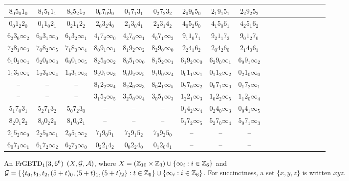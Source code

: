 \documentclass[draft, 11pt]{article}
\begin{document}
\begin{figure}[h!]
\renewcommand{\arraystretch}{1.2}
 \setlength\tabcolsep{1pt}
 \centering
 \small
\begin{tabular}{|c|c|c|c|c|c|c|c|c|c|c|c|c|c|c|c|c|c| }
\hline
$8_0 5_0 1_0$ & $8_1 5_1 1_1$ & $8_2 5_2 1_2$ & $0_0 7_0 3_0$ & $0_1 7_1 3_1$ & $0_2 7_2 3_2$ & $2_0 9_0 5_0$ & $2_1 9_1 5_1$ & $2_2 9_2 5_2$ \\\hline
$0_0 1_2 2_0$ & $0_1 1_0 2_1$ & $0_2 1_1 2_2$ & $2_0 3_2 4_0$ & $2_1 3_0 4_1$ & $2_2 3_1 4_2$ & $4_0 5_2 6_0$ & $4_1 5_0 6_1$ & $4_2 5_1 6_2$ \\\hline
$6_2 3_0 \infty_2$ & $6_0 3_1 \infty_0$ & $6_1 3_2 \infty_1$ & $4_1 7_2 \infty_0$ & $4_2 7_0 \infty_1$ & $4_0 7_1 \infty_2$ & $9_1 1_0 7_1$ & $9_2 1_1 7_2$ & $9_0 1_2 7_0$ \\\hline
$7_2 8_1 \infty_3$ & $7_0 8_2 \infty_5$ & $7_1 8_0 \infty_4$ & $8_0 9_1 \infty_1$ & $8_1 9_2 \infty_2$ & $8_2 9_0 \infty_0$ & $2_2 4_1 6_2$ & $2_0 4_2 6_0$ & $2_1 4_0 6_1$ \\\hline
$6_1 0_2 \infty_4$ & $6_2 0_0 \infty_3$ & $6_0 0_1 \infty_5$ & $8_2 5_0 \infty_2$ & $8_0 5_1 \infty_0$ & $8_1 5_2 \infty_1$ & $6_1 9_2 \infty_0$ & $6_2 9_0 \infty_1$ & $6_0 9_1 \infty_2$ \\\hline
$1_1 3_2 \infty_5$ & $1_2 3_0 \infty_4$ & $1_0 3_1 \infty_3$ & $9_2 0_1 \infty_3$ & $9_0 0_2 \infty_5$ & $9_1 0_0 \infty_4$ & $0_0 1_1 \infty_1$ & $0_1 1_2 \infty_2$ & $0_2 1_0 \infty_0$ \\\hline
-- & -- & -- & $8_1 2_2 \infty_4$ & $8_2 2_0 \infty_3$ & $8_0 2_1 \infty_5$ & $0_2 7_0 \infty_2$ & $0_0 7_1 \infty_0$ & $0_1 7_2 \infty_1$ \\\hline
-- & -- & -- & $3_1 5_2 \infty_5$ & $3_2 5_0 \infty_4$ & $3_0 5_1 \infty_3$ & $1_2 2_1 \infty_3$ & $1_0 2_2 \infty_5$ & $1_1 2_0 \infty_4$ \\\hline
$5_1 7_0 3_1$ & $5_2 7_1 3_2$ & $5_0 7_2 3_0$ & -- & -- & -- & $0_1 4_2 \infty_4$ & $0_2 4_0 \infty_3$ & $0_0 4_1 \infty_5$ \\\hline
$8_2 0_1 2_2$ & $8_0 0_2 2_0$ & $8_1 0_0 2_1$ & -- & -- & -- & $5_1 7_2 \infty_5$ & $5_2 7_0 \infty_4$ & $5_0 7_1 \infty_3$ \\\hline
$2_1 5_2 \infty_0$ & $2_2 5_0 \infty_1$ & $2_0 5_1 \infty_2$ & $7_1 9_0 5_1$ & $7_2 9_1 5_2$ & $7_0 9_2 5_0$ & -- & -- & -- \\\hline
$6_0 7_1 \infty_1$ & $6_1 7_2 \infty_2$ & $6_2 7_0 \infty_0$ & $0_2 2_1 4_2$ & $0_0 2_2 4_0$ & $0_1 2_0 4_1$ & -- & -- & -- \\\hline
\end{tabular}
\caption{An ${\rm FrGBTD}_1(3,6^6)$ $(X,\mathcal G,\mathcal A)$,
where $X=(\mathbb Z_{10}\times\mathbb Z_3)\cup\{\infty_i:i\in \mathbb Z_6\}$ and $\mathcal G= \{ \{t_0,t_1,t_2,(5+t)_0,(5+t)_1,(5+t)_2\}: t\in\mathbb Z_5\} \cup \{\infty_i: i\in\mathbb Z_6 \}$.
For succinctness, a set $\{x,y,z\}$ is written $xyz$.
 }

\label{fig:fgbtd6}
\end{figure}
\end{document}
